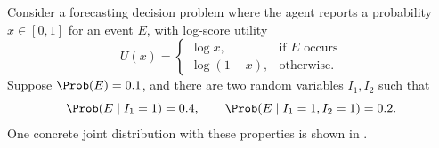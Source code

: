 \begin{example}







Consider a forecasting decision problem where the agent reports a probability $x\in[0,1]$ for an event $E$, with log-score utility
  \[
  U(x)=
  \begin{cases}
  \log x, & \text{if } E \text{ occurs}\\
  \log(1-x), & \text{otherwise.}
  \end{cases}
  \]
  Suppose $\Prob(E)=0.1$, and there are two random variables $I_1,I_2$ such that
  \[
  \Prob(E\mid I_1=1)=0.4,\qquad \Prob(E\mid I_1=1,I_2=1)=0.2.
  \]
  One concrete joint distribution with these properties is shown in .


\end{example}

